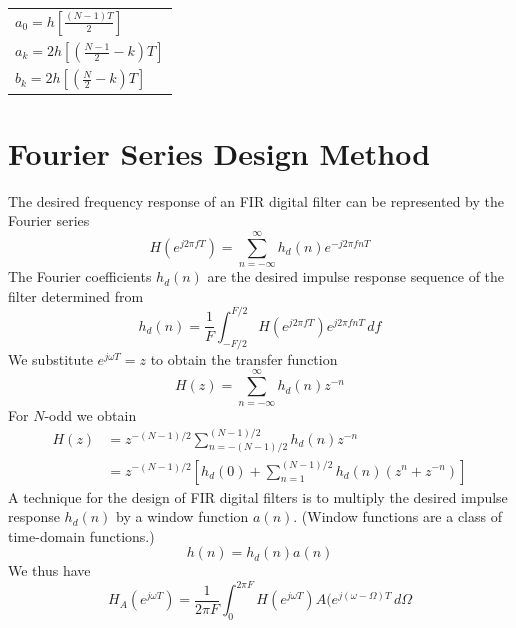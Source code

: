 \documentclass[11pt]{book}
\theoremstyle{example}
\begin{document}
\begin{center}
	\begin{tabular}{|l|}
		\hline
		$a_0=h\left[\frac{(N-1)T}{2}\right]$\\
		$a_k=2h\left[\left(\frac{N-1}{2}-k\right)T\right]$\\
		$b_k=2h\left[\left(\frac{N}{2}-k\right)T\right]$\\
		\hline
	\end{tabular}
\end{center}

\section{Fourier Series Design Method}

The desired frequency response of an FIR digital filter can be represented by the Fourier series
\begin{equation}
	H(e^{j2{\pi}fT})=\sum_{n=-\infty}^\infty{h_d(n)e^{-j2{\pi}fnT}}
\end{equation}
The Fourier coefficients $h_d(n)$ are the desired impulse response sequence of the filter determined from
\begin{equation}
	h_d(n)=\frac{1}{F}\int_{-F/2}^{F/2}{H(e^{j2{\pi}fT})e^{j2{\pi}fnT}\,df}
\end{equation}
We substitute $e^{j{\omega}T}=z$ to obtain the transfer function
\begin{equation}
	H(z)=\sum_{n=-\infty}^\infty{h_d(n)z^{-n}}
\end{equation}
For $N$-odd we obtain
\begin{equation}
	\begin{split}
		H(z)&=z^{-(N-1)/2}\sum_{n=-(N-1)/2}^{(N-1)/2}{h_d(n)z^{-n}}\\
		&=z^{-(N-1)/2}\left[h_d(0)+\sum_{n=1}^{(N-1)/2}{h_d(n)(z^n+z^{-n})}\right]
	\end{split}
\end{equation}
A technique for the design of FIR digital filters is to multiply the desired impulse response $h_d(n)$ by a window function $a(n)$. (Window functions are a class of time-domain functions.)
\begin{equation}
	h(n)=h_d(n)a(n)
\end{equation}
We thus have
\begin{equation}
	H_A(e^{j{\omega}T})=\frac{1}{2{\pi}F}\int_{0}^{2{\pi}F}{H(e^{j{\omega}T})A(e^{j(\omega-\Omega)T}\,d\Omega}
\end{equation}
\end{document}
